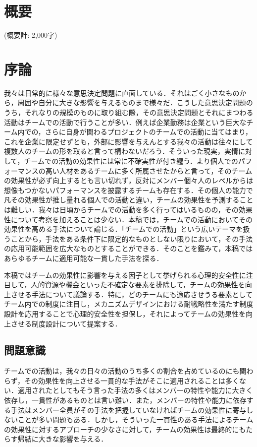\documentclass[a4paper, 11pt]{jsarticle}
\begin{document}
\maketitle

\hspace{0pt}
\vfill
\tableofcontents
\thispagestyle{empty}
\vfill
\hspace{0pt}
\newpage
\section*{概要}
(概要計: 2,000字) 
\section{序論}
我々は日常的に様々な意思決定問題に直面している．それはごく小さなものから，周囲や自分に大きな影響を与えるものまで様々だ．こうした意思決定問題のうち，それなりの規模のものに取り組む際，その意思決定問題とそれにまつわる活動はチームでの活動で行うことが多い．例えば企業勤務は企業という巨大なチーム内での，さらに自身が関わるプロジェクトのチームでの活動に当てはまり，これを企業に限定せずとも，外部に影響を与えんとする我々の活動は往々にして複数人のチームの形を取ると言って構わないだろう．そういった現実，実情に対して，チームでの活動の効果性には常に不確実性が付き纏う．より個人でのパフォーマンスの高い人材をあるチームに多く所属させたからと言って，そのチームの効果性が必ず向上するとも言い切れず，反対にメンバー個々人のレベルからは想像もつかないパフォーマンスを披露するチームも存在する．その個人の能力で凡その効果性が推し量れる個人での活動と違い，チームの効果性を予測することは難しい．我々は日頃からチームでの活動を多く行ってはいるものの，その効果性について考察を加えることは少ない．本稿では，チームでの活動においてその効果性を高める手法について論じる．「チームでの活動」という広いテーマを扱うことから，手法をある条件下に限定的なものとしない限りにおいて，その手法の応用可能範囲を広大なものとすることができる．そのことを鑑みて，本稿ではあらゆるチームに適用可能な一貫した手法を探る．

本稿ではチームの効果性に影響を与える因子として挙げられる心理的安全性に注目して，人的資源や機会といった不確定な要素を排除して，チームの効果性を向上させる手法について議論する．特に，どのチームにも適応させうる要素としてチーム内での制度に注目し，メカニズムデザインにおける耐戦略性を満たす制度設計を応用することで心理的安全性を担保し，それによってチームの効果性を向上させる制度設計について提案する．

\subsection{問題意識}
チームでの活動は，我々の日々の活動のうち多くの割合を占めているのにも関わらず，その効果性を向上させる一貫的な手法がそこに適用されることは多くない．適用されたとしてもそう言った手法の多くはメンバーの特性や能力に大きく依存し，一貫性があるものとは言い難い．また，メンバーの特性や能力に依存する手法はメンバー全員がその手法を把握していなければチームの効果性に寄与しないことが多い問題もある．しかし，そういった一貫性のある手法によるチームの効果性に対するアプローチの少なさに対して，チームの効果性は最終的にもたらす帰結に大きな影響を与える．
\end{document}
